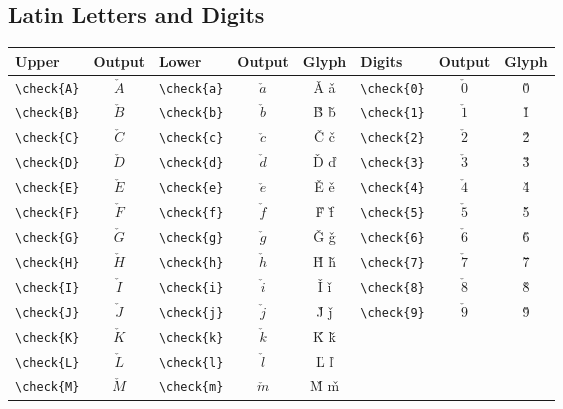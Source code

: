 \documentclass[12pt,a4paper]{article}
\begin{document}
\subsection*{Latin Letters and Digits}
\begin{longtable}{|l|c|l|c|c|l|c|c|}
\hline
\textbf{Upper}   & \textbf{Output} & \textbf{Lower}   & \textbf{Output} & \textbf{Glyph} & \textbf{Digits}  & \textbf{Output} & \textbf{Glyph} \\
\hline
\verb|\check{A}| & $\check{A}$     & \verb|\check{a}| & $\check{a}$     & Ǎ ǎ            & \verb|\check{0}| & $\check{0}$     & 0̌ \\
\verb|\check{B}| & $\check{B}$     & \verb|\check{b}| & $\check{b}$     & B̌ b̌            & \verb|\check{1}| & $\check{1}$     & 1̌ \\
\verb|\check{C}| & $\check{C}$     & \verb|\check{c}| & $\check{c}$     & Č č            & \verb|\check{2}| & $\check{2}$     & 2̌ \\
\verb|\check{D}| & $\check{D}$     & \verb|\check{d}| & $\check{d}$     & Ď ď            & \verb|\check{3}| & $\check{3}$     & 3̌ \\
\verb|\check{E}| & $\check{E}$     & \verb|\check{e}| & $\check{e}$     & Ě ě            & \verb|\check{4}| & $\check{4}$     & 4̌ \\
\verb|\check{F}| & $\check{F}$     & \verb|\check{f}| & $\check{f}$     & F̌ f̌            & \verb|\check{5}| & $\check{5}$     & 5̌ \\
\verb|\check{G}| & $\check{G}$     & \verb|\check{g}| & $\check{g}$     & Ǧ ǧ            & \verb|\check{6}| & $\check{6}$     & 6̌ \\
\verb|\check{H}| & $\check{H}$     & \verb|\check{h}| & $\check{h}$     & Ȟ ȟ            & \verb|\check{7}| & $\check{7}$     & 7̌ \\
\verb|\check{I}| & $\check{I}$     & \verb|\check{i}| & $\check{i}$     & Ǐ ǐ            & \verb|\check{8}| & $\check{8}$     & 8̌ \\
\verb|\check{J}| & $\check{J}$     & \verb|\check{j}| & $\check{j}$     & J̌ ǰ            & \verb|\check{9}| & $\check{9}$     & 9̌ \\
\verb|\check{K}| & $\check{K}$     & \verb|\check{k}| & $\check{k}$     & Ǩ ǩ            &                  &                 & \\
\verb|\check{L}| & $\check{L}$     & \verb|\check{l}| & $\check{l}$     & Ľ ľ            &                  &                 & \\
\verb|\check{M}| & $\check{M}$     & \verb|\check{m}| & $\check{m}$     & M̌ m̌            &                  &                 & \\

\end{longtable}
\end{document}
